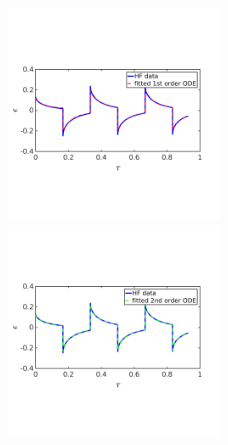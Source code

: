\documentclass[10pt,xcolor=dvipsnames,compress]{beamer}
\begin{document}
\begin{frame}
\begin{figure}
\includegraphics[trim = 0.in  2.3in 0.in 2.8in, clip, width=0.5\textwidth]{figs/Istep_eps_modelfit_1st.png}
~
\includegraphics[trim = 0.in  2.3in 0.in 2.8in, clip, width=0.5\textwidth]{figs/Istep_eps_modelfit_2nd.png}
\end{figure}


\vfill
\end{frame}
\end{document}
